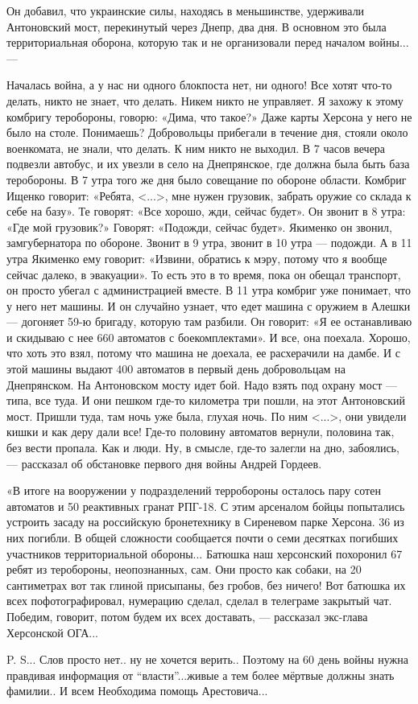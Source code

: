 Он добавил, что украинские силы, находясь в меньшинстве, удерживали Антоновский
мост, перекинутый через Днепр, два дня. В основном это была территориальная
оборона, которую так и не организовали перед началом войны... —

Началась война, а у нас ни одного блокпоста нет, ни одного! Все хотят что-то
делать, никто не знает, что делать. Никем никто не управляет. Я захожу к этому
комбригу теробороны, говорю: «Дима, что такое?» Даже карты Херсона у него не
было на столе. Понимаешь? Добровольцы прибегали в течение дня, стояли около
военкомата, не знали, что делать. К ним никто не выходил. В 7 часов вечера
подвезли автобус, и их увезли в село на Днепрянское, где должна была быть база
теробороны. В 7 утра того же дня было совещание по обороне области. Комбриг
Ищенко говорит: «Ребята, <...>, мне нужен грузовик, забрать оружие со склада к
себе на базу». Те говорят: «Все хорошо, жди, сейчас будет». Он звонит в 8 утра:
«Где мой грузовик?» Говорят: «Подожди, сейчас будет». Якименко он звонил,
замгубернатора по обороне. Звонит в 9 утра, звонит в 10 утра — подожди. А в 11
утра Якименко ему говорит: «Извини, обратись к мэру, потому что я вообще сейчас
далеко, в эвакуации». То есть это в то время, пока он обещал транспорт, он
просто убегал с администрацией вместе. В 11 утра комбриг уже понимает, что у
него нет машины. И он случайно узнает, что едет машина с оружием в Алешки —
догоняет 59-ю бригаду, которую там разбили. Он говорит: «Я ее останавливаю и
скидываю с нее 660 автоматов с боекомплектами». И все, она поехала. Хорошо, что
хоть это взял, потому что машина не доехала, ее расхерачили на дамбе. И с этой
машины выдают 400 автоматов в первый день добровольцам на Днепрянском. На
Антоновском мосту идет бой. Надо взять под охрану мост — типа, все туда. И они
пешком где-то километра три пошли, на этот Антоновский мост. Пришли туда, там
ночь уже была, глухая ночь. По ним <...>, они увидели кишки и как деру дали все!
Где-то половину автоматов вернули, половина так, без вести пропала. Как и люди.
Ну, в смысле, где-то залегли на дно, забоялись, — рассказал об обстановке
первого дня войны Андрей Гордеев.

«В итоге на вооружении у подразделений терробороны осталось пару сотен
автоматов и 50 реактивных гранат РПГ-18. С этим арсеналом бойцы попытались
устроить засаду на российскую бронетехнику в Сиреневом парке Херсона. 36 из них
погибли. В общей сложности сообщается почти о семи десятках погибших участников
территориальной обороны... Батюшка наш херсонский похоронил 67 ребят из
теробороны, неопознанных, сам. Они просто как собаки, на 20 сантиметрах вот так
глиной присыпаны, без гробов, без ничего! Вот батюшка их всех пофотографировал,
нумерацию сделал, сделал в телеграме закрытый чат. Победим, говорит, потом
будем их всех доставать, — рассказал экс-глава Херсонской ОГА...

P. S... Слов просто нет.. ну не хочется  верить.. Поэтому на 60 день войны нужна
правдивая информация от \enquote{власти}...живые а тем более мёртвые должны знать
фамилии.. И всем Необходима помощь Арестовича...
